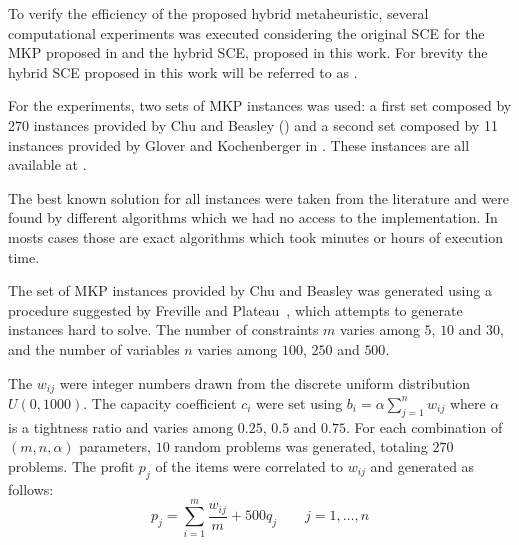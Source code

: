 To verify the efficiency of the proposed hybrid metaheuristic, several computational
experiments was executed considering the original SCE for the MKP proposed in
\cite{baroni2015shuffled} and the hybrid SCE, proposed in this work.
For brevity the hybrid SCE proposed in this work will be referred to as \scecore.

For the experiments, two sets of MKP instances was used:
a first set composed by 270 instances provided by Chu and Beasley (\cite{Chu-Beasley-1998})
and a second set composed by 11 instances provided by Glover and Kochenberger in
\cite{glover1996critical}.
These instances are all available at \cite{ORLibrary}.

The best known solution for all instances were taken from the literature and
were found by different algorithms which we had no access to the implementation.
In mosts cases those are exact algorithms which took
minutes or hours of execution time.

The set of MKP instances provided by Chu and Beasley was generated using a
procedure suggested by Freville and Plateau~\cite{freville1994efficient}, which
attempts to generate instances hard to solve.
The number of constraints $m$ varies among $5$, $10$ and $30$, and the number
of variables $n$ varies among $100$, $250$ and $500$.

The $w_{ij}$ were integer numbers drawn from the discrete uniform distribution
$U(0, 1000)$.
The capacity coefficient $c_i$ were set using
$b_i = \alpha\sum_{j=1}^{n} w_{ij}$ where $\alpha$ is a tightness ratio and
varies among $0.25$, $0.5$ and $0.75$.
For each combination of $(m,n,\alpha)$ parameters, $10$ random problems was generated,
totaling $270$ problems.
The profit $p_j$ of the items were correlated to $w_{ij}$ and generated as follows:
\begin{displaymath}
  p_j = \sum_{i=1}^m \frac{w_{ij}}{m} + 500q_j \qquad j = 1, \ldots, n
\end{displaymath}



